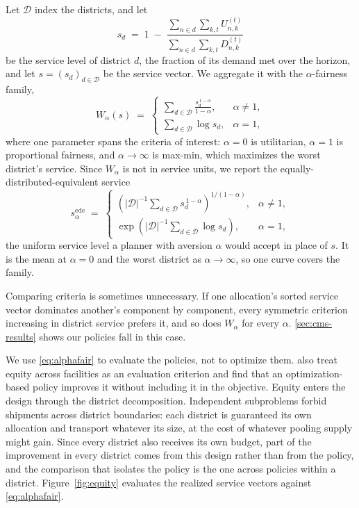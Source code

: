 \documentclass[11pt]{article}
\begin{document}
Let $\mathcal{D}$ index the districts, and let
\begin{equation}
s_d \;=\; 1 \;-\;
\frac{\sum_{n \in d}\sum_{k,t} U_{n,k}^{(t)}}
     {\sum_{n \in d}\sum_{k,t} D_{n,k}^{(t)}}
\label{eq:service}
\end{equation}
be the service level of district $d$, the fraction of its demand met over the horizon, and let $s = (s_d)_{d \in \mathcal{D}}$ be the service vector.
We aggregate it with the $\alpha$-fairness family,
\begin{equation}
W_\alpha(s) \;=\;
\begin{cases}
\displaystyle\sum_{d \in \mathcal{D}} \frac{s_d^{\,1-\alpha}}{1-\alpha}, & \alpha \neq 1,\\[2ex]
\displaystyle\sum_{d \in \mathcal{D}} \log s_d, & \alpha = 1,
\end{cases}
\label{eq:alphafair}
\end{equation}
where one parameter spans the criteria of interest: $\alpha = 0$ is utilitarian, $\alpha = 1$ is proportional fairness, and $\alpha \to \infty$ is max-min, which maximizes the worst district's service.
Since $W_\alpha$ is not in service units, we report the equally-distributed-equivalent service
\begin{equation}
s^{\mathrm{ede}}_\alpha \;=\;
\begin{cases}
\displaystyle\left( |\mathcal{D}|^{-1} \textstyle\sum_{d \in \mathcal{D}} s_d^{\,1-\alpha} \right)^{1/(1-\alpha)}, & \alpha \neq 1,\\[2ex]
\displaystyle\exp\left( |\mathcal{D}|^{-1} \textstyle\sum_{d \in \mathcal{D}} \log s_d \right), & \alpha = 1,
\end{cases}
\label{eq:ede}
\end{equation}
the uniform service level a planner with aversion $\alpha$ would accept in place of $s$.
It is the mean at $\alpha = 0$ and the worst district as $\alpha \to \infty$, so one curve covers the family.

Comparing criteria is sometimes unnecessary.
If one allocation's sorted service vector dominates another's component by component, every symmetric criterion increasing in district service prefers it, and so does $W_\alpha$ for every $\alpha$.
\Sec\ref{sec:cms-results} shows our policies fall in this case.

We use \eqref{eq:alphafair} to evaluate the policies, not to optimize them.
\citet{gallien21} also treat equity across facilities as an evaluation criterion and find that an optimization-based policy improves it without including it in the objective.
Equity enters the design through the district decomposition.
Independent subproblems forbid shipments across district boundaries: each district is guaranteed its own allocation and transport whatever its size, at the cost of whatever pooling supply might gain.
Since every district also receives its own budget, part of the improvement in every district comes from this design rather than from the policy, and the comparison that isolates the policy is the one across policies within a district.
Figure~\ref{fig:equity} evaluates the realized service vectors against \eqref{eq:alphafair}.
\end{document}

